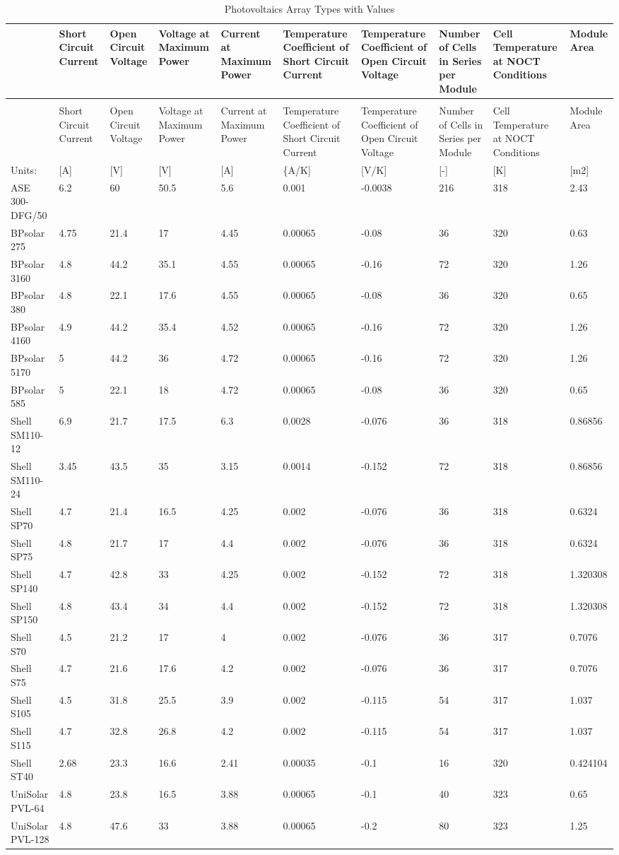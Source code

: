 \begin{longtable}[c]{p{0.6in}p{0.6in}p{0.6in}p{0.6in}p{0.6in}p{0.6in}p{0.6in}p{0.6in}p{0.6in}p{0.6in}}
\caption{Photovoltaics Array Types with Values \label{table:photovoltaics-array-types-with-values}} \tabularnewline
\toprule 
 & Short Circuit Current & Open Circuit Voltage & Voltage at Maximum Power & Current at Maximum Power & Temperature Coefficient of Short Circuit Current & Temperature Coefficient of Open Circuit Voltage & Number of Cells in Series per Module & Cell Temperature at NOCT Conditions & Module Area \tabularnewline
\midrule
\endfirsthead

\caption[]{Photovoltaics Array Types with Values} \tabularnewline
\toprule 
 & Short Circuit Current & Open Circuit Voltage & Voltage at Maximum Power & Current at Maximum Power & Temperature Coefficient of Short Circuit Current & Temperature Coefficient of Open Circuit Voltage & Number of Cells in Series per Module & Cell Temperature at NOCT Conditions & Module Area \tabularnewline
\midrule
\endhead

Units: & [A] & [V] & [V] & [A] & \{A/K] & [V/K] & [-] & [K] & [m2] \tabularnewline
ASE 300-DFG/50 & 6.2 & 60 & 50.5 & 5.6 & 0.001 & -0.0038 & 216 & 318 & 2.43 \tabularnewline
BPsolar 275 & 4.75 & 21.4 & 17 & 4.45 & 0.00065 & -0.08 & 36 & 320 & 0.63 \tabularnewline
BPsolar 3160 & 4.8 & 44.2 & 35.1 & 4.55 & 0.00065 & -0.16 & 72 & 320 & 1.26 \tabularnewline
BPsolar 380 & 4.8 & 22.1 & 17.6 & 4.55 & 0.00065 & -0.08 & 36 & 320 & 0.65 \tabularnewline
BPsolar 4160 & 4.9 & 44.2 & 35.4 & 4.52 & 0.00065 & -0.16 & 72 & 320 & 1.26 \tabularnewline
BPsolar 5170 & 5 & 44.2 & 36 & 4.72 & 0.00065 & -0.16 & 72 & 320 & 1.26 \tabularnewline
BPsolar 585 & 5 & 22.1 & 18 & 4.72 & 0.00065 & -0.08 & 36 & 320 & 0.65 \tabularnewline
Shell SM110-12 & 6.9 & 21.7 & 17.5 & 6.3 & 0.0028 & -0.076 & 36 & 318 & 0.86856 \tabularnewline
Shell SM110-24 & 3.45 & 43.5 & 35 & 3.15 & 0.0014 & -0.152 & 72 & 318 & 0.86856 \tabularnewline
Shell SP70 & 4.7 & 21.4 & 16.5 & 4.25 & 0.002 & -0.076 & 36 & 318 & 0.6324 \tabularnewline
Shell SP75 & 4.8 & 21.7 & 17 & 4.4 & 0.002 & -0.076 & 36 & 318 & 0.6324 \tabularnewline
Shell SP140 & 4.7 & 42.8 & 33 & 4.25 & 0.002 & -0.152 & 72 & 318 & 1.320308 \tabularnewline
Shell SP150 & 4.8 & 43.4 & 34 & 4.4 & 0.002 & -0.152 & 72 & 318 & 1.320308 \tabularnewline
Shell S70 & 4.5 & 21.2 & 17 & 4 & 0.002 & -0.076 & 36 & 317 & 0.7076 \tabularnewline
Shell S75 & 4.7 & 21.6 & 17.6 & 4.2 & 0.002 & -0.076 & 36 & 317 & 0.7076 \tabularnewline
Shell S105 & 4.5 & 31.8 & 25.5 & 3.9 & 0.002 & -0.115 & 54 & 317 & 1.037 \tabularnewline
Shell S115 & 4.7 & 32.8 & 26.8 & 4.2 & 0.002 & -0.115 & 54 & 317 & 1.037 \tabularnewline
Shell ST40 & 2.68 & 23.3 & 16.6 & 2.41 & 0.00035 & -0.1 & 16 & 320 & 0.424104 \tabularnewline
UniSolar PVL-64 & 4.8 & 23.8 & 16.5 & 3.88 & 0.00065 & -0.1 & 40 & 323 & 0.65 \tabularnewline
UniSolar PVL-128 & 4.8 & 47.6 & 33 & 3.88 & 0.00065 & -0.2 & 80 & 323 & 1.25 \tabularnewline
\bottomrule
\end{longtable}

